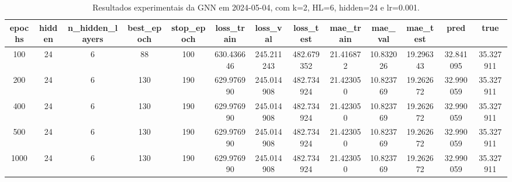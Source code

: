 \begin{table}[h]
\centering
\caption{Resultados experimentais da GNN em 2024-05-04, com k=2, HL=6, hidden=24 e lr=0.001.}
\label{tab:gnn_results_k2_hl6_h24_d20240504}
\begin{tabular}{ccccccccccccc}
\toprule
epochs & hidden & n\_hidden\_layers & best\_epoch & stop\_epoch & loss\_train & loss\_val & loss\_test & mae\_train & mae\_val & mae\_test & pred & true \\
\midrule
100 & 24 & 6 & 88 & 100 & 630.436646 & 245.211243 & 482.679352 & 21.416872 & 10.832026 & 19.296343 & 32.841095 & 35.327911 \\
200 & 24 & 6 & 130 & 190 & 629.976990 & 245.014908 & 482.734924 & 21.423050 & 10.823769 & 19.262672 & 32.990059 & 35.327911 \\
400 & 24 & 6 & 130 & 190 & 629.976990 & 245.014908 & 482.734924 & 21.423050 & 10.823769 & 19.262672 & 32.990059 & 35.327911 \\
500 & 24 & 6 & 130 & 190 & 629.976990 & 245.014908 & 482.734924 & 21.423050 & 10.823769 & 19.262672 & 32.990059 & 35.327911 \\
1000 & 24 & 6 & 130 & 190 & 629.976990 & 245.014908 & 482.734924 & 21.423050 & 10.823769 & 19.262672 & 32.990059 & 35.327911 \\
\bottomrule
\end{tabular}
\end{table}
